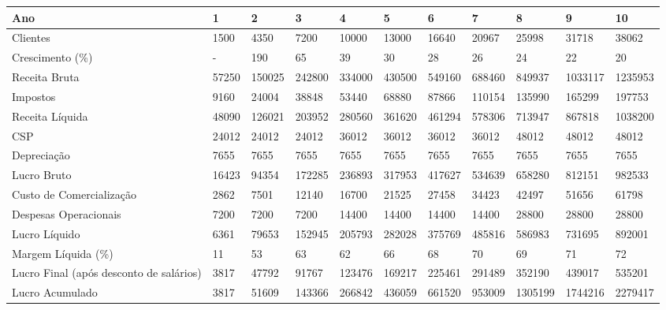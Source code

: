 \documentclass[a4paper, 12pt]{paper}
\begin{document}
\begin{landscape}
	\begin{table}[ht]
		\centering
		\begin{tabular}{p{5cm}p{1.5cm}p{1.5cm}p{1.5cm}p{1.5cm}p{1.5cm}p{1.5cm}p{1.5cm}p{1.5cm}p{1.5cm}p{1.5cm}}
			\hline
			\cellcolor{gray}Ano & \cellcolor{gray}1 & \cellcolor{gray}2 & \cellcolor{gray}3 & \cellcolor{gray}4 & \cellcolor{gray}5 & \cellcolor{gray}6 & \cellcolor{gray}7 & \cellcolor{gray}8 &\cellcolor{gray} 9 & \cellcolor{gray}10 \\ \hline
			Clientes & 1500 & 4350 & 7200 & 10000 & 13000 & 16640 & 20967 & 25998 & 31718 & 38062 \\ \hline
			Crescimento (\%) & - & 190 & 65 & 39 & 30 & 28 & 26 & 24 & 22 & 20 \\ \hline
			Receita Bruta & 57250 & 150025 & 242800 & 334000 & 430500 & 549160 & 688460 & 849937 & 1033117 & 1235953 \\ \hline
			Impostos & 9160 & 24004 & 38848 & 53440 & 68880 & 87866 & 110154 & 135990 & 165299 & 197753 \\ \hline
			Receita Líquida & 48090 & 126021 & 203952 & 280560 & 361620 & 461294 & 578306 & 713947 & 867818 & 1038200 \\ \hline
			CSP & 24012 & 24012 & 24012 & 36012 & 36012 & 36012 & 36012 & 48012 & 48012 & 48012 \\ \hline
			Depreciação & 7655 & 7655 & 7655 & 7655 & 7655 & 7655 & 7655 & 7655 & 7655 & 7655 \\ \hline
			Lucro Bruto & 16423 & 94354 & 172285 & 236893 & 317953 & 417627 & 534639 & 658280 & 812151 & 982533 \\ \hline
			Custo de Comercialização & 2862 & 7501 & 12140 & 16700 & 21525 & 27458 & 34423 & 42497 & 51656 & 61798 \\ \hline
			Despesas Operacionais & 7200 & 7200 & 7200 & 14400 & 14400 & 14400 & 14400 & 28800 & 28800 & 28800 \\ \hline
			Lucro Líquido & 6361 & 79653 & 152945 & 205793 & 282028 & 375769 & 485816 & 586983 & 731695 & 892001 \\ \hline
			Margem Líquida (\%) & 11 & 53 & 63 & 62 & 66 & 68 & 70 & 69 & 71 & 72 \\ \hline
			Lucro Final (após desconto de salários) & 3817 & 47792 & 91767 & 123476 & 169217 & 225461 & 291489 & 352190 & 439017 & 535201 \\ \hline
			Lucro Acumulado & 3817 & 51609 & 143366 & 266842 & 436059 & 661520 & 953009 & 1305199 & 1744216 & 2279417 \\ \hline
		\end{tabular}
	\end{table}
\newpage

\end{landscape}
\end{document}
